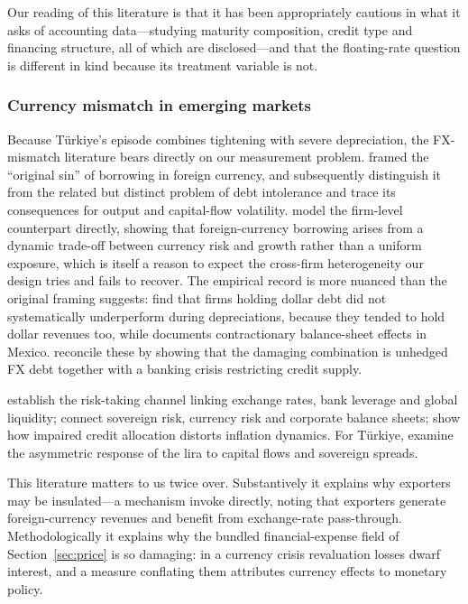 \documentclass[review,12pt,authoryear]{elsarticle}
\theoremstyle{plain}
\theoremstyle{definition}
\begin{document}
Our reading of this literature is that it has been appropriately cautious in
what it asks of accounting data---studying maturity composition, credit type and
financing structure, all of which are disclosed---and that the floating-rate
question is different in kind because its treatment variable is not.

\subsubsection{Currency mismatch in emerging markets}

Because T\"{u}rkiye's episode combines tightening with severe depreciation, the
FX-mismatch literature bears directly on our measurement problem.
\citet{eichengreen1999} framed the ``original sin'' of borrowing in foreign
currency, and \citet{eichengreenhausmannpanizza2003,eichengreenhausmannpanizza2005}
subsequently distinguish it from the related but distinct problem of debt
intolerance and trace its consequences for output and capital-flow volatility.
\citet{salomaovarela2022} model the firm-level counterpart directly, showing
that foreign-currency borrowing arises from a dynamic trade-off between
currency risk and growth rather than a uniform exposure, which is itself a
reason to expect the cross-firm heterogeneity our design tries and fails to
recover. The empirical record is more nuanced than the original framing
suggests: \citet{bleakley2008} find that firms holding dollar debt did not
systematically underperform during depreciations, because they tended to hold
dollar revenues too, while \citet{aguiar2005} documents contractionary
balance-sheet effects in Mexico. \citet{kalemli2016} reconcile these by
showing that the damaging combination is unhedged FX debt together with a
banking crisis restricting credit supply.

\citet{bruno2015a,bruno2015b} establish the risk-taking channel linking exchange
rates, bank leverage and global liquidity; \citet{du2022} connect sovereign
risk, currency risk and corporate balance sheets; \citet{acharya2024} show how
impaired credit allocation distorts inflation dynamics. For T\"{u}rkiye,
\citet{akbal2026} examine the asymmetric response of the lira to capital flows
and sovereign spreads.

This literature matters to us twice over. Substantively it explains why
exporters may be insulated---a mechanism \citet{sengul2026} invoke directly,
noting that exporters generate foreign-currency revenues and benefit from
exchange-rate pass-through. Methodologically it explains why the bundled
financial-expense field of Section~\ref{sec:price} is so damaging: in a currency
crisis revaluation losses dwarf interest, and a measure conflating them
attributes currency effects to monetary policy.
\end{document}
